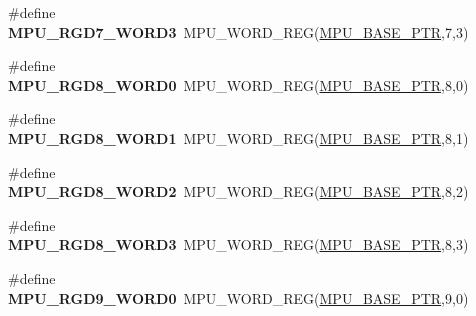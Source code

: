\begin{DoxyCompactItemize}
\item 
\hypertarget{group___m_p_u___register___accessor___macros_ga108666443b99fa2a3f1baac629933c92}{}\#define {\bfseries M\+P\+U\+\_\+\+R\+G\+D7\+\_\+\+W\+O\+R\+D3}~M\+P\+U\+\_\+\+W\+O\+R\+D\+\_\+\+R\+E\+G(\hyperlink{group___m_p_u___peripheral_gae2d60f80178d84225d77e5f0214d1f1d}{M\+P\+U\+\_\+\+B\+A\+S\+E\+\_\+\+P\+T\+R},7,3)\label{group___m_p_u___register___accessor___macros_ga108666443b99fa2a3f1baac629933c92}

\item 
\hypertarget{group___m_p_u___register___accessor___macros_ga9ea9005e478009f35751f86737447a06}{}\#define {\bfseries M\+P\+U\+\_\+\+R\+G\+D8\+\_\+\+W\+O\+R\+D0}~M\+P\+U\+\_\+\+W\+O\+R\+D\+\_\+\+R\+E\+G(\hyperlink{group___m_p_u___peripheral_gae2d60f80178d84225d77e5f0214d1f1d}{M\+P\+U\+\_\+\+B\+A\+S\+E\+\_\+\+P\+T\+R},8,0)\label{group___m_p_u___register___accessor___macros_ga9ea9005e478009f35751f86737447a06}

\item 
\hypertarget{group___m_p_u___register___accessor___macros_gac71151a2fb6e9c5ebc2eda0ce0dbc0df}{}\#define {\bfseries M\+P\+U\+\_\+\+R\+G\+D8\+\_\+\+W\+O\+R\+D1}~M\+P\+U\+\_\+\+W\+O\+R\+D\+\_\+\+R\+E\+G(\hyperlink{group___m_p_u___peripheral_gae2d60f80178d84225d77e5f0214d1f1d}{M\+P\+U\+\_\+\+B\+A\+S\+E\+\_\+\+P\+T\+R},8,1)\label{group___m_p_u___register___accessor___macros_gac71151a2fb6e9c5ebc2eda0ce0dbc0df}

\item 
\hypertarget{group___m_p_u___register___accessor___macros_ga84f84af37f2bd5663e8ce1e3dbf4c519}{}\#define {\bfseries M\+P\+U\+\_\+\+R\+G\+D8\+\_\+\+W\+O\+R\+D2}~M\+P\+U\+\_\+\+W\+O\+R\+D\+\_\+\+R\+E\+G(\hyperlink{group___m_p_u___peripheral_gae2d60f80178d84225d77e5f0214d1f1d}{M\+P\+U\+\_\+\+B\+A\+S\+E\+\_\+\+P\+T\+R},8,2)\label{group___m_p_u___register___accessor___macros_ga84f84af37f2bd5663e8ce1e3dbf4c519}

\item 
\hypertarget{group___m_p_u___register___accessor___macros_ga0368f44f59dd6ed39ec25cd9555277e2}{}\#define {\bfseries M\+P\+U\+\_\+\+R\+G\+D8\+\_\+\+W\+O\+R\+D3}~M\+P\+U\+\_\+\+W\+O\+R\+D\+\_\+\+R\+E\+G(\hyperlink{group___m_p_u___peripheral_gae2d60f80178d84225d77e5f0214d1f1d}{M\+P\+U\+\_\+\+B\+A\+S\+E\+\_\+\+P\+T\+R},8,3)\label{group___m_p_u___register___accessor___macros_ga0368f44f59dd6ed39ec25cd9555277e2}

\item 
\hypertarget{group___m_p_u___register___accessor___macros_ga45cf4555557fc2548f4331619eb6500b}{}\#define {\bfseries M\+P\+U\+\_\+\+R\+G\+D9\+\_\+\+W\+O\+R\+D0}~M\+P\+U\+\_\+\+W\+O\+R\+D\+\_\+\+R\+E\+G(\hyperlink{group___m_p_u___peripheral_gae2d60f80178d84225d77e5f0214d1f1d}{M\+P\+U\+\_\+\+B\+A\+S\+E\+\_\+\+P\+T\+R},9,0)\label{group___m_p_u___register___accessor___macros_ga45cf4555557fc2548f4331619eb6500b}


\end{DoxyCompactItemize}
